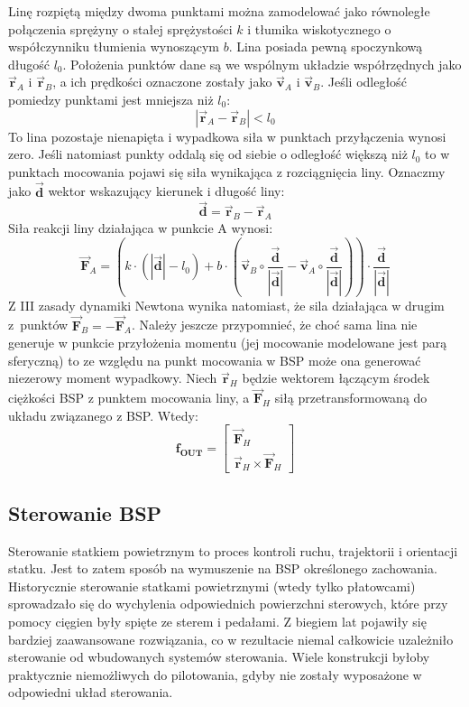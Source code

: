 Linę rozpiętą między dwoma punktami można zamodelować jako równoległe połączenia sprężyny o stałej sprężystości $k$ i tłumika wiskotycznego o współczynniku tłumienia wynoszącym $b$. Lina posiada pewną spoczynkową długość $l_0$. Położenia punktów dane są we wspólnym układzie współrzędnych jako $\vec{\bm{r}}_{A}$ i $\vec{\bm{r}}_{B}$, a ich prędkości oznaczone zostały jako $\vec{\bm{v}}_{A}$ i $\vec{\bm{v}}_{B}$. Jeśli odległość pomiedzy punktami jest mniejsza niż $l_0$:
\[
	| \vec{\bm{r}}_{A} - \vec{\bm{r}}_{B} | < l_0
\]
To lina pozostaje nienapięta i wypadkowa siła w punktach przyłączenia wynosi zero. Jeśli natomiast punkty oddalą się od siebie o odległość większą niż $l_0$ to w punktach mocowania pojawi się siła wynikająca z rozciągnięcia liny. Oznaczmy jako $\vec{\bm{d}}$ wektor wskazujący kierunek i długość liny:
\[
	\vec{\bm{d}} =  \vec{\bm{r}}_{B} - \vec{\bm{r}}_{A}
\]
Siła reakcji liny działająca w punkcie A wynosi:
\[
	\vec{\bm{F}}_{A} =\left(  k \cdot \left( |\vec{\bm{d}}| - l_0 \right) + b \cdot \left( \vec{\bm{v}}_{B}  \circ \frac{\vec{\bm{d}}}{|\vec{\bm{d}}|} - \vec{\bm{v}}_{A} \circ \frac{\vec{\bm{d}}}{|\vec{\bm{d}}|} \right) \right)  \cdot \frac{\vec{\bm{d}}}{|\vec{\bm{d}}|}
\]
Z III zasady dynamiki Newtona wynika natomiast, że sila działająca w drugim z~punktów $\vec{\bm{F}}_{B} = - \vec{\bm{F}}_{A}$. Należy jeszcze przypomnieć, że choć sama lina nie generuje w punkcie przyłożenia momentu (jej mocowanie modelowane jest parą sferyczną) to ze względu na punkt mocowania w BSP może ona generować niezerowy moment wypadkowy. Niech $\vec{\bm{r}}_{H}$ będzie wektorem łączącym środek ciężkości BSP z punktem mocowania liny, a $\vec{\bm{F}}_{H}$ siłą przetransformowaną do układu związanego z BSP. Wtedy:
\[
	\bm{f_{OUT}} = \begin{bmatrix} \vec{\bm{F}}_{H} \\ \vec{\bm{r}}_{H} \times \vec{\bm{F}}_{H} \end{bmatrix}
\]


\subsection{Sterowanie BSP}

Sterowanie statkiem powietrznym to proces kontroli ruchu, trajektorii i orientacji statku. Jest to zatem sposób na wymuszenie na BSP określonego zachowania. Historycznie sterowanie statkami powietrznymi (wtedy tylko płatowcami) sprowadzało się do wychylenia odpowiednich powierzchni sterowych, które przy pomocy cięgien były spięte ze sterem i pedałami. Z biegiem lat pojawiły się bardziej zaawansowane rozwiązania, co w rezultacie niemal całkowicie uzależniło sterowanie od wbudowanych systemów sterowania. Wiele konstrukcji byłoby praktycznie niemożliwych do pilotowania, gdyby nie zostały wyposażone w odpowiedni układ sterowania.\\


